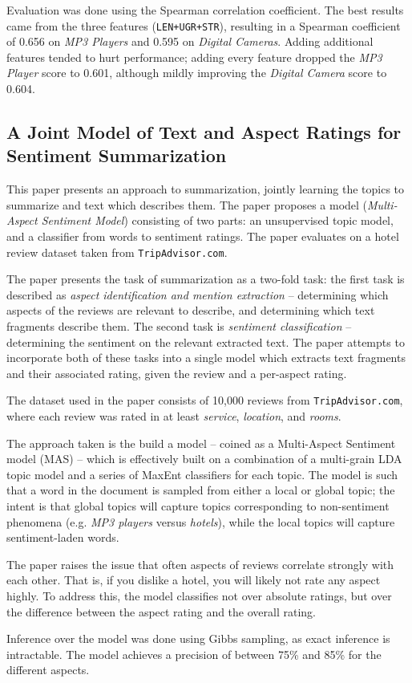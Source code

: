 \documentclass[letter,12pt]{article}
\begin{document}
Evaluation was done using the Spearman correlation coefficient.
The best results came from the three features ({\tt LEN+UGR+STR}),
	resulting in a Spearman coefficient of 0.656 on {\em MP3 Players}
	and 0.595 on {\em Digital Cameras}.
Adding additional features tended to hurt performance; adding every feature
	dropped the {\em MP3 Player} score to 0.601,
	although mildly improving the {\em Digital Camera} score to 0.604.

\subsection{A Joint Model of Text and Aspect Ratings for Sentiment Summarization \cite{2008titov-summarization}}

This paper presents an approach to summarization, jointly learning the topics to summarize and text which
	describes them.
The paper proposes a model ({\em Multi-Aspect Sentiment Model}) consisting of two parts: 
	an unsupervised topic model, and a classifier from words to sentiment ratings.
The paper evaluates on a hotel review dataset taken from {\tt TripAdvisor.com}.

The paper presents the task of summarization as a two-fold task: the first task
	is described as {\em aspect identification and mention extraction} -- determining which aspects of the
	reviews are relevant to describe, and determining which text fragments describe them.
The second task is {\em sentiment classification} -- determining the sentiment on the
	relevant extracted text.
The paper attempts to incorporate both of these tasks into a single model which extracts text fragments
	and their associated rating, given the review and a per-aspect rating.

The dataset used in the paper consists of 10,000 reviews from {\tt TripAdvisor.com}, where each
review was rated in at least {\em service}, {\em location}, and {\em rooms}.

The approach taken is the build a model -- coined as a Multi-Aspect Sentiment model (MAS) --
	which is effectively built on a combination of a multi-grain LDA topic model and a series of MaxEnt
	classifiers for each topic.
The model is such that a word in the document is sampled from either a local or global topic;
	the intent is that global topics will capture topics corresponding to non-sentiment phenomena
	(e.g. {\em MP3 players} versus {\em hotels}), while the local topics will capture sentiment-laden
	words.

The paper raises the issue that often aspects of reviews correlate strongly with each other.
That is, if you dislike a hotel, you will likely not rate any aspect highly.
To address this, the model classifies not over absolute ratings, but over the difference between
	the aspect rating and the overall rating.

Inference over the model was done using Gibbs sampling, as exact inference is intractable.
The model achieves a precision of between 75\% and 85\% for the different aspects.



\end{document}
